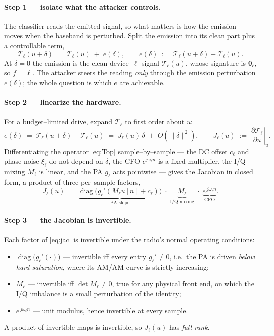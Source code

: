 \documentclass[11pt]{article}
\newcommand{\Top}[1]{\mathcal{T}_{#1}}          %
\newcommand{\ba}{\bm{\theta}}
\begin{document}
\paragraph{Step 1 --- isolate what the attacker controls.} The classifier reads the emitted
signal, so what matters is how the emission moves when the baseband is perturbed. Split the
emission into its clean part plus a controllable term,
\begin{equation}
\Top{\ell}(u+\delta)\;=\;\Top{\ell}(u)\;+\;e(\delta),
\qquad
e(\delta)\;:=\;\Top{\ell}(u+\delta)-\Top{\ell}(u).
\label{eq:emiss-split}
\end{equation}
At $\delta=0$ the emission is the clean device--$\ell$ signal $\Top{\ell}(u)$, whose signature is
$\ba_\ell$, so $f=\ell$. The attacker steers the reading \emph{only} through the emission
perturbation $e(\delta)$; the whole question is which $e$ are achievable.

\paragraph{Step 2 --- linearize the hardware.} For a budget--limited drive, expand $\Top{\ell}$ to
first order about $u$:
\begin{equation}
e(\delta)\;=\;\Top{\ell}(u+\delta)-\Top{\ell}(u)\;=\;J_\ell(u)\,\delta\;+\;O(\|\delta\|^2),
\qquad
J_\ell(u)\;:=\;\left.\frac{\partial\Top{\ell}}{\partial u}\right|_{u}.
\label{eq:taylor}
\end{equation}
Differentiating the operator \eqref{eq:Top} sample--by--sample --- the DC offset $c_\ell$ and phase
noise $\xi_\ell$ do not depend on $\delta$, the CFO $e^{j\omega_\ell n}$ is a fixed multiplier, the
I/Q mixing $M_\ell$ is linear, and the PA $g_\ell$ acts pointwise --- gives the Jacobian in closed
form, a product of three per--sample factors,
\begin{equation}
J_\ell(u)\;=\;
\underbrace{\operatorname{diag}\!\big(g_\ell'(M_\ell u[n]+c_\ell)\big)}_{\text{PA slope}}
\;\cdot\;
\underbrace{M_\ell}_{\text{I/Q mixing}}
\;\cdot\;
\underbrace{e^{\,j\omega_\ell n}}_{\text{CFO}} .
\label{eq:jac}
\end{equation}

\paragraph{Step 3 --- the Jacobian is invertible.} Each factor of \eqref{eq:jac} is invertible
under the radio's normal operating conditions:
\begin{itemize}\itemsep2pt
\item $\operatorname{diag}\!\big(g_\ell'(\cdot)\big)$ --- invertible iff every entry $g_\ell'\neq0$,
i.e.\ the PA is driven \emph{below hard saturation}, where its AM/AM curve is strictly increasing;
\item $M_\ell$ --- invertible iff $\det M_\ell\neq0$, true for any physical front end, on which the
I/Q imbalance is a small perturbation of the identity;
\item $e^{\,j\omega_\ell n}$ --- unit modulus, hence invertible at every sample.
\end{itemize}
A product of invertible maps is invertible, so $J_\ell(u)$ has \emph{full rank}.
\end{document}
